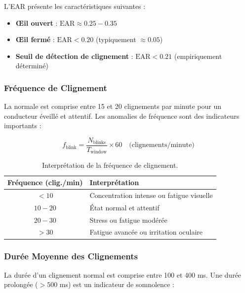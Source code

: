 L'EAR présente les caractéristiques suivantes :
\begin{itemize}
    \item \textbf{Œil ouvert} : $\text{EAR} \approx 0.25 - 0.35$
    \item \textbf{Œil fermé} : $\text{EAR} < 0.20$ (typiquement $\approx 0.05$)
    \item \textbf{Seuil de détection de clignement} : $\text{EAR} < 0.21$ (empiriquement déterminé)
\end{itemize}

\subsubsection{Fréquence de Clignement}

La  normale est comprise entre 15 et 20 clignements par minute pour un conducteur éveillé et attentif. Les anomalies de fréquence sont des indicateurs importants :

\begin{equation}
f_{\text{blink}} = \frac{N_{\text{blinks}}}{T_{\text{window}}} \times 60 \quad \text{(clignements/minute)}
\label{eq:blink_freq}
\end{equation}

\begin{table}[H]
\centering
\caption{Interprétation de la fréquence de clignement.}
\label{tab:blink_freq}
\renewcommand{\arraystretch}{1.3}
\begin{tabular}{|c|l|}
\hline
\rowcolor{stellantisblue!15}
\textbf{Fréquence (clig./min)} & \textbf{Interprétation} \\
\hline
$< 10$ & Concentration intense ou fatigue visuelle \\
\hline
$10 - 20$ & État normal et attentif \\
\hline
$20 - 30$ & Stress ou fatigue modérée \\
\hline
$> 30$ & Fatigue avancée ou irritation oculaire \\
\hline
\end{tabular}
\end{table}

\subsubsection{Durée Moyenne des Clignements}

La durée d'un clignement normal est comprise entre 100 et 400 ms. Une durée prolongée ($> 500$ ms) est un indicateur de somnolence :

